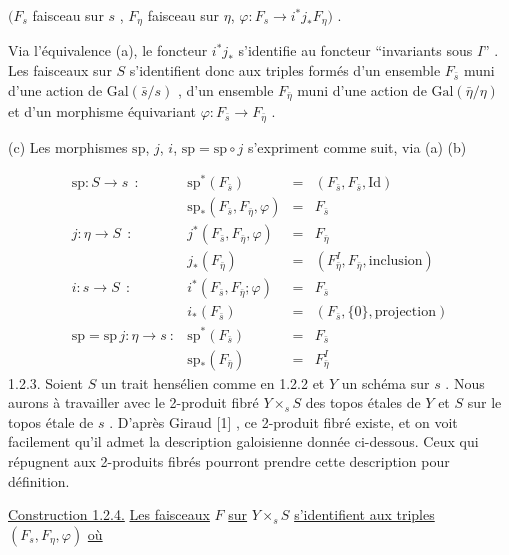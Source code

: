 $(F_s$ faisceau sur $s$ , $F_\eta$ faisceau sur $\eta$, $\varphi : F_s \longrightarrow i^* j_* F_\eta )$ .

Via l'équivalence (a), le foncteur $i^* j_*$ s'identifie au foncteur ``invariants sous $I$'' . Les faisceaux sur $S$ s'identifient donc aux triples formés d'un ensemble $F_{\bar{s}}$ muni d'une action de $\mathrm{Gal}(\bar{s}/s)$ , d'un ensemble $F_{\bar{\eta}}$ muni d'une action de $\mathrm{Gal}(\bar{\eta}/\eta)$ et d'un morphisme équivariant $\varphi : F_{\bar{s}} \longrightarrow F_{\bar{\eta}}$ .

(c) Les morphismes $\mathrm{sp}$, $j$, $i$, $\mathrm{sp} = \mathrm{sp} \circ j$ s'expriment comme suit, via (a) (b)

\begin{equation*}
\begin{array}{llcl}
\mathrm{sp} : S \longrightarrow s \ \ : & \mathrm{sp}^*(F_{\bar{s}}) & = & (F_{\bar{s}}, F_{\bar{s}}, \mathrm{Id}) \\[2pt]
& \mathrm{sp}_*(F_{\bar{s}}, F_{\bar{\eta}}, \varphi) & = & F_{\bar{s}} \\[2pt]
j : \eta \longrightarrow S \ \ : & j^*(F_{\bar{s}}, F_{\bar{\eta}}, \varphi) & = & F_{\bar{\eta}} \\[2pt]
& j_*(F_{\bar{\eta}}) & = & (F^{I}_{\bar{\eta}}, F_{\bar{\eta}}, \mathrm{inclusion}) \\[2pt]
i : s \longrightarrow S \ \ : & i^*(F_{\bar{s}}, F_{\bar{\eta}}; \varphi) & = & F_{\bar{s}} \\[2pt]
& i_*(F_{\bar{s}}) & = & (F_{\bar{s}}, \{0\}, \mathrm{projection}) \\[2pt]
\mathrm{sp} = \mathrm{sp}\, j : \eta \longrightarrow s \ : & \mathrm{sp}^*(F_{\bar{s}}) & = & F_{\bar{s}} \\[2pt]
& \mathrm{sp}_*(F_{\bar{\eta}}) & = & F^{I}_{\bar{\eta}}
\end{array}
\end{equation*}
1.2.3. Soient $S$ un trait hensélien comme en 1.2.2 et $Y$ un schéma sur $s$ . Nous aurons à travailler avec le 2-produit fibré $Y \times_s S$ des topos étales de $Y$ et $S$ sur le topos étale de $s$ . D'après Giraud [1] , ce 2-produit fibré existe, et on voit facilement qu'il admet la description galoisienne donnée ci-dessous. Ceux qui
répugnent aux 2-produits fibrés pourront prendre cette description pour définition.

\underline{Construction 1.2.4.} \underline{Les faisceaux} $F$ \underline{sur} $Y \times_s S$ \underline{s'identifient aux triples} $(F_s, F_\eta, \varphi )$ \underline{où}

